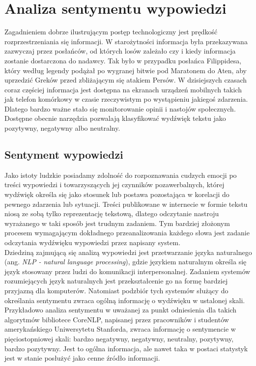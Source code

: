 \chapter{Analiza sentymentu wypowiedzi}
Zagadnieniem dobrze ilustrującym postęp technologiczny jest prędkość rozprzestrzeniania się informacji. W starożytności informacja była przekazywana zazwyczaj przez posłańców, od których losów zależało czy i kiedy informacja zostanie dostarczona do nadawcy. Tak było w przypadku posłańca Filippidesa, który według legendy podążał po wygranej bitwie pod Maratonem do Aten, aby uprzedzić Greków przed zbliżającym się atakiem Persów. W dzisiejszych czasach coraz częściej informacja jest dostępna na ekranach urządzeń mobilnych takich jak telefon komórkowy w czasie rzeczywistym po wystąpieniu jakiegoś zdarzenia. Dlatego bardzo ważne stało się monitorowanie opinii i nastojów społecznych. Dostępne obecnie narzędzia pozwalają klasyfikować wydźwięk tekstu jako pozytywny, negatywny albo neutralny.

\section{Sentyment wypowiedzi}
Jako istoty ludzkie posiadamy zdolność do rozpoznawania cudzych emocji po treści wypowiedzi i towarzyszących jej czynników pozawerbalnych, której wydźwięk określa się jako stosunek lub postawa pozostająca w korelacji do pewnego zdarzenia lub sytuacji. Treści publikowane w internecie w formie tekstu niosą ze sobą tylko reprezentację tekstową, dlatego odczytanie nastroju wyrażanego w taki sposób jest trudnym zadaniem. Tym bardziej złożonym procesem wymagającym dokładnego przeanalizowania każdego słowa jest zadanie odczytania wydźwięku wypowiedzi przez napisany system. \\
Dziedziną zajmującą się analizą wypowiedzi jest przetwarzanie języka naturalnego (ang. \textit{NLP - natural language processing}), gdzie językiem naturalnym określa się język stosowany przez ludzi do komunikacji interpersonalnej. Zadaniem systemów rozumiejących język naturalnych jest przekształcenie go na formę bardziej przyjazną dla komputerów. Natomiast podzbiór tych systemów służący do określania sentymentu zwraca ogólną informację o wydźwięku w ustalonej skali. Przykładowo analiza sentymentu w uważanej za punkt odniesienia dla takich algorytmów bibliotece CoreNLP, napisanej przez pracowników i studentów amerykańskiego Uniwersytetu Stanforda, zwraca informację o sentymencie w pięciostopniowej skali: bardzo negatywny, negatywny, neutralny, pozytywny, bardzo pozytywny. Jest to ogólna informacja, ale nawet taka w postaci statystyk jest w stanie posłużyć jako cenne źródło informacji.

